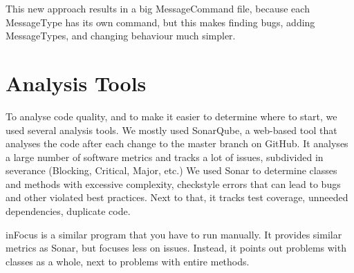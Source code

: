 This new approach results in a big MessageCommand file, because each MessageType has its own command, but this makes finding bugs, adding MessageTypes, and changing behaviour much simpler.

\section{Analysis Tools}
To analyse code quality, and to make it easier to determine where to start, we used several analysis tools. We mostly used SonarQube, a web-based tool that analyses the code after each change to the master branch on GitHub. It analyses a large number of software metrics and tracks a lot of issues, subdivided in severance (Blocking, Critical, Major, etc.) We used Sonar to determine classes and methods with excessive complexity, checkstyle errors that can lead to bugs and other violated best practices. Next to that, it tracks test coverage, unneeded dependencies, duplicate code.

inFocus is a similar program that you have to run manually. It provides similar metrics as Sonar, but focuses less on issues. Instead, it points out problems with classes as a whole, next to problems with entire methods. 